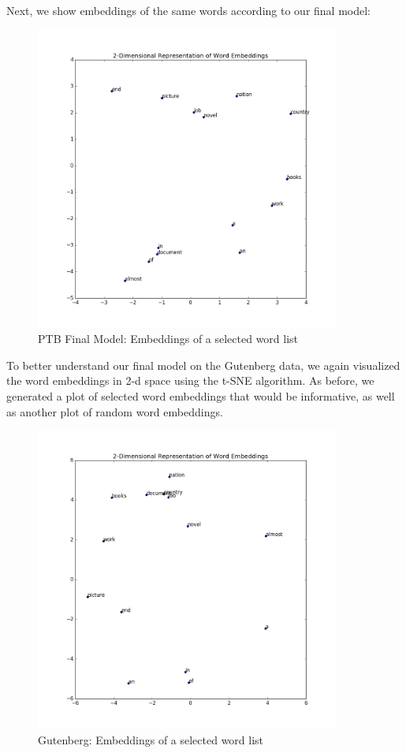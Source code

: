 \documentclass[a4paper]{article}
\begin{document}
Next, we show embeddings of the same words according to our final model:

\begin{figure}[H]
  \includegraphics[width=10cm]{../plots/PTB_dropout_point3_two_layer_200_hidden_200_embeddding_word_list_embeddings.png}
  \centering
  \caption{PTB Final Model: Embeddings of a selected word list}
  \label{fig:ptb1}
\end{figure}

To better understand our final model on the Gutenberg data, we again visualized the word embeddings in 2-d space using the t-SNE algorithm. As before, we generated a plot of selected word embeddings that would be informative, as well as another plot of random word embeddings.

\begin{figure}[H]
  \includegraphics[width=10cm]{../plots/gutenberg_word_list_embeddings.png}
  \centering
  \caption{Gutenberg: Embeddings of a selected word list}
  \label{fig:boat1}
\end{figure}
\end{document}
